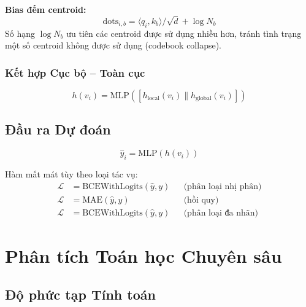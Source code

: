 \documentclass[12pt,a4paper]{article}
\begin{document}
\textbf{Bias đếm centroid:}
\begin{equation}
  \text{dots}_{i,b} = \langle q_i, k_b \rangle / \sqrt{d} + \log N_b
  \label{eq:centroid_bias}
\end{equation}
Số hạng $\log N_b$ ưu tiên các centroid được sử dụng nhiều hơn, tránh tình trạng
một số centroid không được sử dụng (codebook collapse).

\subsubsection{Kết hợp Cục bộ -- Toàn cục}

\begin{equation}
  h(v_i) = \text{MLP}([h_\text{local}(v_i) \| h_\text{global}(v_i)])
  \label{eq:combine}
\end{equation}

\subsection{Đầu ra Dự đoán}

\begin{equation}
  \hat{y}_i = \text{MLP}(h(v_i))
  \label{eq:head}
\end{equation}

Hàm mất mát tùy theo loại tác vụ:
\begin{align}
  \mathcal{L} &= \text{BCEWithLogits}(\hat{y}, y) & &\text{(phân loại nhị phân)}\\
  \mathcal{L} &= \text{MAE}(\hat{y}, y) & &\text{(hồi quy)}\\
  \mathcal{L} &= \text{BCEWithLogits}(\hat{y}, y) & &\text{(phân loại đa nhãn)}
\end{align}

\section{Phân tích Toán học Chuyên sâu}

\subsection{Độ phức tạp Tính toán}
\end{document}
